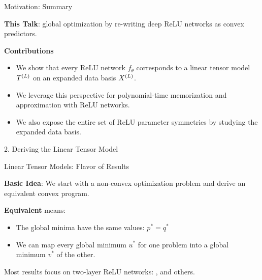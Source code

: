 \documentclass[usenames,dvipsnames,notheorems]{beamer}
\newcommand{\bad}[1]{\textcolor{bad}{#1}}
\newcommand{\good}[1]{\textcolor{good}{#1}}
\begin{document}
\begin{frame}{Motivation: Summary}

	\textbf{This Talk}: global optimization by re-writing deep ReLU networks as
	convex predictors.

	\pause
	\vspace{3ex}

	\textbf{Contributions}
	\begin{itemize}
		\item We show that every \bad{ReLU network} \( f_\theta \) corresponds
		      to a \good{linear tensor model} \( T^{(L)} \) on an expanded data basis \( X^{(L)} \).
		      \pause
		      \vspace{1.5ex}

		\item We leverage this perspective for polynomial-time \good{memorization}
		      and \good{approximation} with ReLU networks.
		      \pause
		      \vspace{1.5ex}

		\item We also expose the entire set of \bad{ReLU parameter symmetries}
		      by studying the \good{expanded data basis}.
	\end{itemize}

\end{frame}

\begin{frame}{}
	\begin{center}
		\huge
		2. Deriving the Linear Tensor Model
	\end{center}
\end{frame}

\begin{frame}{Linear Tensor Models: Flavor of Results}

	\textbf{Basic Idea}: We start with a \bad{non-convex} optimization problem
	and derive an equivalent \good{convex} program.

	\pause
	\vspace{2em}

	\textbf{Equivalent} means:
	\pause
	\vspace{0.5em}
	\begin{itemize}
		\item The global minima have the same values: \( p^* = q^* \)
		      \vspace{1em}
		      \pause
		\item We can map every global minimum \( u^* \) for one problem into
		      a global minimum \( v^* \) of the other.
	\end{itemize}

	\pause
	\vspace{2ex}

	Most results focus on \bad{two-layer ReLU networks}:
	\citet{pilanci2020convex, sahiner2021vector, sahiner2022attention, wang2022hidden, mishkin2023optimal},
	and \good{others}.

\end{frame}
\end{document}
